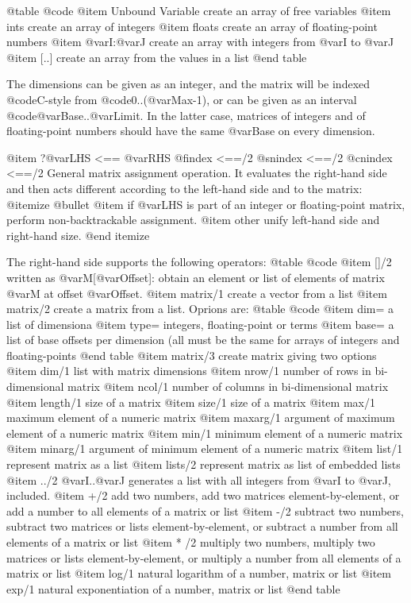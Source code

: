 @table @code
@item Unbound Variable
create an array of free variables
@item ints 
create an array of integers
@item floats 
create an array of floating-point numbers
@item @var{I}:@var{J}
create an array with integers from @var{I} to @var{J}
@item [..]
create an array from the values in a list
 @end table

The dimensions can be given as an integer, and the matrix will be
indexed @code{C}-style from  @code{0..(@var{Max}-1)}, or can be given
as  an interval @code{@var{Base}..@var{Limit}}. In the latter case,
matrices of integers and of floating-point numbers should have the same
@var{Base} on every dimension.

@item ?@var{LHS} <== @var{RHS}
@findex <==/2
@snindex <==/2
@cnindex <==/2
General matrix assignment operation. It evaluates the right-hand side
and then acts different according to the
left-hand side and to the matrix:
@itemize @bullet
@item if @var{LHS} is part of an integer or floating-point matrix,
perform non-backtrackable assignment.
@item other unify left-hand side and right-hand size.
@end itemize

The right-hand side supports the following operators: 
@table @code
@item []/2
written as @var{M}[@var{Offset}]: obtain an element or list of elements
of matrix @var{M} at offset @var{Offset}.
@item matrix/1
create a vector from a list
@item matrix/2
create a matrix from a list. Oprions are:
@table @code
@item dim=
a list of dimensiona
@item type=
integers, floating-point or terms
@item base=
a list of base offsets per dimension (all must be the same for arrays of
integers and floating-points
@end table
@item matrix/3
create matrix giving two options
@item dim/1
list with matrix dimensions
@item nrow/1
number of rows in bi-dimensional matrix
@item ncol/1
number of columns in bi-dimensional matrix
@item length/1
size of a matrix
@item size/1
size of a matrix
@item max/1
maximum element of a numeric matrix
@item maxarg/1
argument of maximum element of a numeric matrix
@item min/1
minimum element of a numeric matrix
@item minarg/1
argument of minimum element of a numeric matrix
@item list/1
represent matrix as a list
@item lists/2
represent matrix as list of embedded lists
@item ../2
@var{I}..@var{J} generates a list with all integers from @var{I} to
@var{J}, included.
@item +/2
add two numbers, add two matrices element-by-element, or add a number to
all elements of a matrix or list
@item -/2 
subtract two numbers, subtract two matrices or lists element-by-element, or subtract a number from
all elements of a matrix or list
@item * /2 
multiply two numbers, multiply two matrices or lists element-by-element, or multiply a number from
all elements of a matrix or list
@item log/1 
natural logarithm of a number, matrix or list
@item exp/1 
natural exponentiation of a number, matrix or list
@end table

